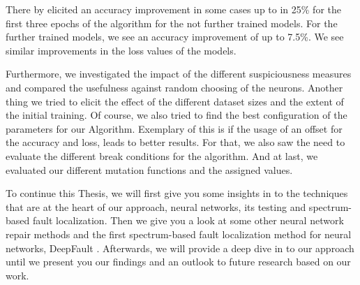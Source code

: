 There by elicited an accuracy improvement in some cases up to in 25\% for the first three epochs of the algorithm for the not further trained models.
For the further trained models, we see an accuracy improvement of up to 7.5\%.
We see similar improvements in the loss values of the models.

Furthermore, we investigated the impact of the different suspiciousness measures and compared the usefulness against random choosing of the neurons.
Another thing we tried to elicit the effect of the different dataset sizes and the extent of the initial training.
Of course, we also tried to find the best configuration of the parameters for our Algorithm.
Exemplary of this is if the usage of an offset for the accuracy and loss, leads to better results.
For that, we also saw the need to evaluate the different break conditions for the algorithm.
And at last, we evaluated our different mutation functions and the assigned values.

To continue this Thesis, we will first give you some insights in to the techniques that are at the heart of our approach, neural networks, its testing and spectrum-based fault localization.
Then we give you a look at some other neural network repair methods and the first spectrum-based fault localization method for neural networks, DeepFault \cite{eniser_deepfault_2019}.
Afterwards, we will provide a deep dive in to our approach until we present you our findings and an outlook to future research based on our work.